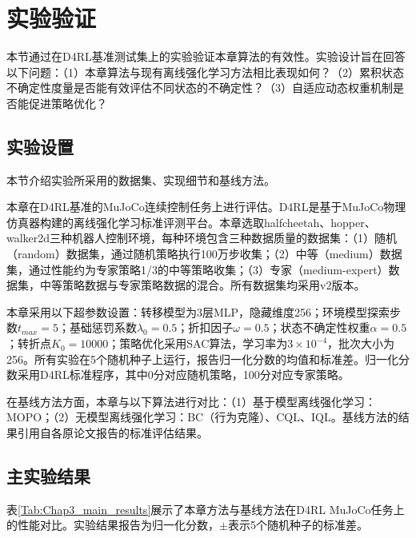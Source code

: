 \section{实验验证}\label{Sec3.4}

本节通过在D4RL基准测试集上的实验验证本章算法的有效性。实验设计旨在回答以下问题：（1）本章算法与现有离线强化学习方法相比表现如何？（2）累积状态不确定性度量是否能有效评估不同状态的不确定性？（3）自适应动态权重机制是否能促进策略优化？


\subsection{实验设置}\label{Sec3.4.1}

本节介绍实验所采用的数据集、实现细节和基线方法。

本章在D4RL基准\cite{Fu2020D4RL}的MuJoCo连续控制任务上进行评估。D4RL是基于MuJoCo物理仿真器\cite{Todorov2012MuJoCo}构建的离线强化学习标准评测平台。本章选取halfcheetah、hopper、walker2d三种机器人控制环境，每种环境包含三种数据质量的数据集：（1）随机（random）数据集，通过随机策略执行100万步收集；（2）中等（medium）数据集，通过性能约为专家策略1/3的中等策略收集；（3）专家（medium-expert）数据集，中等策略数据与专家策略数据的混合。所有数据集均采用v2版本。

本章采用以下超参数设置：转移模型为3层MLP，隐藏维度256；环境模型探索步数$t_{max} = 5$；基础惩罚系数$\lambda_0 = 0.5$；折扣因子$\omega = 0.5$；状态不确定性权重$\alpha = 0.5$；转折点$K_0 = 10000$；策略优化采用SAC\cite{Haarnoja2018SAC}算法，学习率为$3 \times 10^{-4}$，批次大小为256。所有实验在5个随机种子上运行，报告归一化分数的均值和标准差。归一化分数采用D4RL标准程序\cite{Fu2020D4RL}，其中0分对应随机策略，100分对应专家策略。

在基线方法方面，本章与以下算法进行对比：（1）基于模型离线强化学习：MOPO\cite{Yu2020MOPO}；（2）无模型离线强化学习：BC（行为克隆）\cite{Torabi2018BC}、CQL\cite{Kumar2020CQL}、IQL\cite{Kostrikov2022IQL}。基线方法的结果引用自各原论文报告的标准评估结果。


\subsection{主实验结果}\label{Sec3.4.2}

表\ref{Tab:Chap3_main_results}展示了本章方法与基线方法在D4RL MuJoCo任务上的性能对比。实验结果报告为归一化分数，$\pm$表示5个随机种子的标准差。

